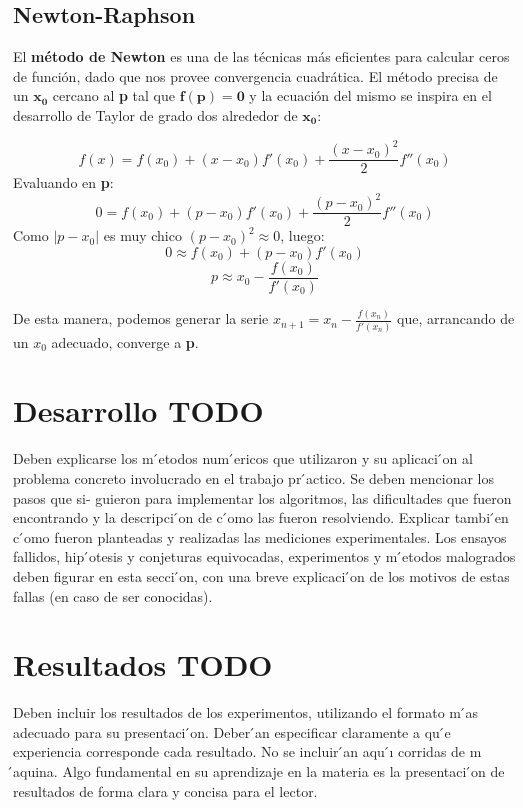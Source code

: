 \documentclass[a4paper]{article}
\begin{document}
\subsection{Newton-Raphson}
El \textbf{método de Newton} es una de las técnicas más eficientes para calcular ceros de función, dado que nos provee convergencia cuadrática. El método precisa de un $\mathbf{x_0}$ cercano al \textbf{p} tal que $\mathbf{f(p) = 0}$ y la ecuación del mismo se inspira en el desarrollo de Taylor de grado dos alrededor de $\mathbf{x_0}$:

$$f(x) = f(x_0) + (x - x_0)f'(x_0) + \frac{(x - x_0)^2}{2}f''(x_0)$$
Evaluando en \textbf{p}:
$$0 = f(x_0) + (p - x_0)f'(x_0) + \frac{(p - x_0)^2}{2}f''(x_0)$$
Como  $|p - x_0|$ es muy chico $(p - x_0)^2 \approx 0$, luego:  
$$0 \approx f(x_0) + (p - x_0)f'(x_0)$$
$$p \approx x_0 - \frac{f(x_0)}{f'(x_0)}$$

De esta manera, podemos generar la serie $x_{n + 1} = x_n - \frac{f(x_n)}{f'(x_n)}$ que, arrancando de un $x_0$ adecuado, converge a \textbf{p}.


\section{Desarrollo TODO}
Deben explicarse los m ́etodos num ́ericos que utilizaron y su aplicaci ́on al problema concreto involucrado en el trabajo pr ́actico. Se deben mencionar los pasos que si- guieron para implementar los algoritmos, las dificultades que fueron encontrando y la descripci ́on de c ́omo las fueron resolviendo. Explicar tambi ́en c ́omo fueron planteadas y realizadas las mediciones experimentales. Los ensayos fallidos, hip ́otesis y conjeturas equivocadas, experimentos y m ́etodos malogrados deben figurar en esta secci ́on, con una breve explicaci ́on de los motivos de estas fallas (en caso de ser conocidas).

\section{Resultados TODO}
Deben incluir los resultados de los experimentos, utilizando el formato m ́as adecuado para su presentaci ́on. Deber ́an especificar claramente a qu ́e experiencia corresponde cada resultado. No se incluir ́an aqu ́ı corridas de m ́aquina. Algo fundamental en su aprendizaje en la materia es la presentaci ́on de resultados de forma clara y concisa para el lector.
\end{document}

